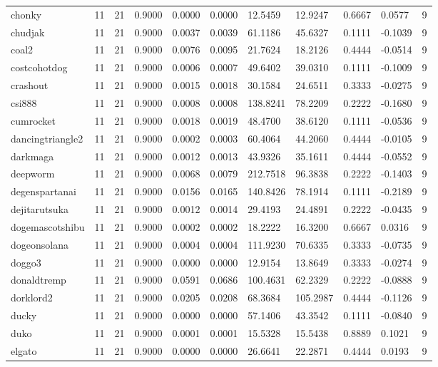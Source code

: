 \begin{table}[htbp]
\begin{tabular}{lllllllllll}
chonky & 11 & 21 & 0.9000 & 0.0000 & 0.0000 & 12.5459 & 12.9247 & 0.6667 & 0.0577 & 9 \\
chudjak & 11 & 21 & 0.9000 & 0.0037 & 0.0039 & 61.1186 & 45.6327 & 0.1111 & -0.1039 & 9 \\
coal2 & 11 & 21 & 0.9000 & 0.0076 & 0.0095 & 21.7624 & 18.2126 & 0.4444 & -0.0514 & 9 \\
costcohotdog & 11 & 21 & 0.9000 & 0.0006 & 0.0007 & 49.6402 & 39.0310 & 0.1111 & -0.1009 & 9 \\
crashout & 11 & 21 & 0.9000 & 0.0015 & 0.0018 & 30.1584 & 24.6511 & 0.3333 & -0.0275 & 9 \\
csi888 & 11 & 21 & 0.9000 & 0.0008 & 0.0008 & 138.8241 & 78.2209 & 0.2222 & -0.1680 & 9 \\
cumrocket & 11 & 21 & 0.9000 & 0.0018 & 0.0019 & 48.4700 & 38.6120 & 0.1111 & -0.0536 & 9 \\
dancingtriangle2 & 11 & 21 & 0.9000 & 0.0002 & 0.0003 & 60.4064 & 44.2060 & 0.4444 & -0.0105 & 9 \\
darkmaga & 11 & 21 & 0.9000 & 0.0012 & 0.0013 & 43.9326 & 35.1611 & 0.4444 & -0.0552 & 9 \\
deepworm & 11 & 21 & 0.9000 & 0.0068 & 0.0079 & 212.7518 & 96.3838 & 0.2222 & -0.1403 & 9 \\
degenspartanai & 11 & 21 & 0.9000 & 0.0156 & 0.0165 & 140.8426 & 78.1914 & 0.1111 & -0.2189 & 9 \\
dejitarutsuka & 11 & 21 & 0.9000 & 0.0012 & 0.0014 & 29.4193 & 24.4891 & 0.2222 & -0.0435 & 9 \\
dogemascotshibu & 11 & 21 & 0.9000 & 0.0002 & 0.0002 & 18.2222 & 16.3200 & 0.6667 & 0.0316 & 9 \\
dogeonsolana & 11 & 21 & 0.9000 & 0.0004 & 0.0004 & 111.9230 & 70.6335 & 0.3333 & -0.0735 & 9 \\
doggo3 & 11 & 21 & 0.9000 & 0.0000 & 0.0000 & 12.9154 & 13.8649 & 0.3333 & -0.0274 & 9 \\
donaldtremp & 11 & 21 & 0.9000 & 0.0591 & 0.0686 & 100.4631 & 62.2329 & 0.2222 & -0.0888 & 9 \\
dorklord2 & 11 & 21 & 0.9000 & 0.0205 & 0.0208 & 68.3684 & 105.2987 & 0.4444 & -0.1126 & 9 \\
ducky & 11 & 21 & 0.9000 & 0.0000 & 0.0000 & 57.1406 & 43.3542 & 0.1111 & -0.0840 & 9 \\
duko & 11 & 21 & 0.9000 & 0.0001 & 0.0001 & 15.5328 & 15.5438 & 0.8889 & 0.1021 & 9 \\
elgato & 11 & 21 & 0.9000 & 0.0000 & 0.0000 & 26.6641 & 22.2871 & 0.4444 & 0.0193 & 9 \\

\end{tabular}
\end{table}
